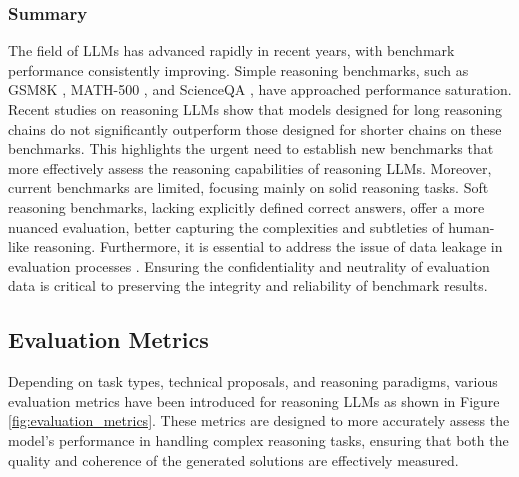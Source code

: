 \subsubsection{Summary} 

The field of LLMs has advanced rapidly in recent years, with benchmark performance consistently improving. 
Simple reasoning benchmarks, such as GSM8K \cite{cobbe2021training}, MATH-500 \cite{lightmanlet}, and ScienceQA \cite{lu2022learn}, have approached performance saturation. 
Recent studies on reasoning LLMs \cite{guan2025rstarmathsmallllmsmaster,RedStar} show that models designed for long reasoning chains do not significantly outperform those designed for shorter chains on these benchmarks. 
This highlights the urgent need to establish new benchmarks that more effectively assess the reasoning capabilities of reasoning LLMs. 
Moreover, current benchmarks are limited, focusing mainly on solid reasoning tasks. 
Soft reasoning benchmarks, lacking explicitly defined correct answers, offer a more nuanced evaluation, better capturing the complexities and subtleties of human-like reasoning. Furthermore, it is essential to address the issue of data leakage in evaluation processes \cite{li2024open}. 
Ensuring the confidentiality and neutrality of evaluation data is critical to preserving the integrity and reliability of benchmark results.


\subsection{Evaluation Metrics}\label{metrics}

Depending on task types, technical proposals, and reasoning paradigms, various evaluation metrics have been introduced for reasoning LLMs as shown in Figure \ref{fig:evaluation_metrics}. These metrics are designed to more accurately assess the model's performance in handling complex reasoning tasks, ensuring that both the quality and coherence of the generated solutions are effectively measured. 




